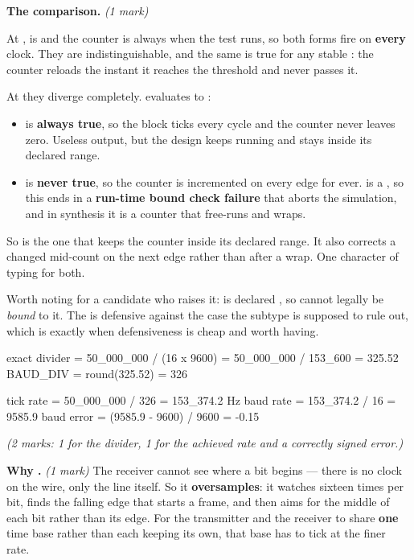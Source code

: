 \textbf{The comparison.} \textit{(1 mark)}

At ,  is  and the counter is always  when the test
runs, so both forms fire on \textbf{every} clock. They are indistinguishable, and the same is true
for any stable : the counter reloads the instant it reaches the threshold and never passes
it.

At  they diverge completely.  evaluates to :
\begin{itemize}
  \item {} is \textbf{always true}, so the block ticks every cycle and the counter
    never leaves zero. Useless output, but the design keeps running and stays inside its declared
    range.
  \item {} is \textbf{never true}, so the counter is incremented on every edge for
    ever.  is a , so this ends in a \textbf{run-time bound check failure}
    that aborts the simulation, and in synthesis it is a counter that free-runs and wraps.
\end{itemize}
So \code{>=} is the one that keeps the counter inside its declared range. It also corrects a
 changed mid-count on the next edge rather than after a wrap. One character of typing for
both.

Worth noting for a candidate who raises it:  is declared ,
so  cannot legally be \emph{bound} to it. The \code{>=} is defensive against the case the
subtype is supposed to rule out, which is exactly when defensiveness is cheap and worth having.

\begin{console}
exact divider = 50_000_000 / (16 x 9600) = 50_000_000 / 153_600 = 325.52
BAUD_DIV       = round(325.52) = 326

tick rate = 50_000_000 / 326 = 153_374.2 Hz
baud rate = 153_374.2 / 16   = 9585.9 baud
error     = (9585.9 - 9600) / 9600 = -0.15%
\end{console}

{\itshape (2 marks: 1 for the divider, 1 for the achieved rate and a correctly signed error.)\par}

\medskip
\textbf{Why .} \textit{(1 mark)} The receiver cannot see where a bit begins ---
there is no clock on the wire, only the line itself. So it \textbf{oversamples}: it watches
 sixteen times per bit, finds the falling edge that starts a frame, and then aims for the
middle of each bit rather than its edge. For the transmitter and the receiver to share \textbf{one}
time base rather than each keeping its own, that base has to tick at the finer rate.

